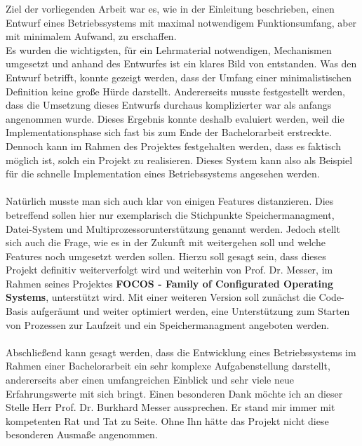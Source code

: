 Ziel der vorliegenden Arbeit war es, wie in der Einleitung beschrieben, einen Entwurf eines Betriebssystems mit maximal notwendigem Funktionsumfang, aber mit minimalem Aufwand, zu erschaffen.\\
Es wurden die wichtigsten, f\"ur ein Lehrmaterial notwendigen, Mechanismen umgesetzt und anhand des Entwurfes ist ein klares Bild von \mops entstanden. Was den Entwurf betrifft, konnte gezeigt werden, dass der Umfang einer minimalistischen Definition keine gro\ss e H\"urde darstellt. Andererseits musste festgestellt werden, dass die Umsetzung dieses Entwurfs durchaus komplizierter war als anfangs angenommen wurde. Dieses Ergebnis konnte deshalb evaluiert werden, weil die Implementationsphase sich fast bis zum Ende der Bachelorarbeit erstreckte. Dennoch kann im Rahmen des Projektes festgehalten werden, dass es faktisch m\"oglich ist, solch ein Projekt zu realisieren. Dieses System kann also als Beispiel f\"ur die schnelle Implementation eines Betriebssystems angesehen werden.\\\\
Nat\"urlich musste man sich auch klar von einigen Features distanzieren. Dies betreffend sollen hier nur exemplarisch die Stichpunkte Speichermanagment, Datei-System und Multiprozessorunterst\"utzung genannt werden. Jedoch stellt sich auch die Frage, wie es in der Zukunft mit \mops weitergehen soll und welche Features noch umgesetzt werden sollen. Hierzu soll gesagt sein, dass dieses Projekt definitiv weiterverfolgt wird und weiterhin von Prof. Dr. Messer, im Rahmen seines Projektes \textbf{FOCOS - Family of Configurated Operating Systems}, unterst\"utzt wird. Mit einer weiteren Version soll zun\"achst die Code-Basis aufger\"aumt und weiter optimiert werden, eine Unterst\"utzung zum Starten von Prozessen zur Laufzeit und ein Speichermanagment angeboten werden.\\\\
Abschlie\ss end kann gesagt werden, dass die Entwicklung eines Betriebssystems im Rahmen einer Bachelorarbeit ein sehr komplexe Aufgabenstellung darstellt, andererseits aber einen umfangreichen Einblick und sehr viele neue Erfahrungswerte mit sich bringt. Einen besonderen Dank m\"ochte ich an dieser Stelle Herr Prof. Dr. Burkhard Messer aussprechen. Er stand mir immer mit kompetenten Rat und Tat zu Seite. Ohne Ihn h\"atte das Projekt nicht diese besonderen Ausma\ss e angenommen.
\nocite{clanguageII}
